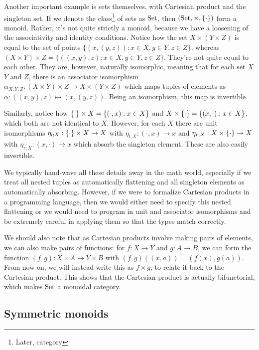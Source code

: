 Another important example is sets themselves, with Cartesian product and the singleton set.
If we denote the class\footnote{Later, category} of sets as $\mathrm{Set}$, then $(\mathrm{Set}, \times, \{\cdot\})$ form a monoid.
Rather, it's not quite strictly a monoid, because we have a loosening of the associativity and identity conditions.
Notice how the set $X\times(Y\times Z)$ is equal to the set of points $\{(x,(y,z)):x\in X, y\in Y, z\in Z\}$, whereas
$(X\times Y)\times Z = \{((x,y),z):x\in X, y\in Y, z\in Z\}$.
They're not quite equal to each other.
They are, however, naturally isomorphic, meaning that for each set $X$ $Y$ and $Z$, there is an associator isomorphism $\alpha_{X,Y,Z}: (X\times Y)\times Z \rightarrow X\times (Y\times Z)$ which maps tuples of elements as $\alpha : ((x,y),z) \mapsto (x,(y,z))$.
Being an isomorphism, this map is invertible.

Similarly, notice how $\{\cdot\} \times X = \{(\cdot, x):x\in X\}$ and $X\times \{\cdot\} = \{(x,\cdot):x\in X\}$, which both are not identical to $X$.
However, for each $X$ there are unit isomorphisms $\eta_{l;X} : \{\cdot\} \times X \rightarrow X$ with $\eta_{l;X} : (\cdot, x) \rightarrow x$ and $\eta_{r;X} : X \times \{\cdot\} \rightarrow X$ with $\eta_{r;X} : (x,\cdot) \rightarrow x$ which absorb the singleton element.
These are also easily invertible.

We typically hand-wave all these details away in the math world, especially if we treat all nested tuples as automatically flattening and all singleton elements as automatically absorbing.
However, if we were to formalize Cartesian products in a programming language, then we would either need to specify this nested flattening or we would need to program in unit and associator isomorphisms and be extremely careful in applying them so that the types match correctly.

We should also note that as Cartesian products involve making pairs of elements, we can also make pairs of functions:
for $f : X\rightarrow Y$ and $g:A\rightarrow B$, we can form the function $(f,g) : X\times A \rightarrow Y\times B$ with $(f,g)((x,a)) = (f(x), g(a))$.
From now on, we will instead write this as $f\times g$, to relate it back to the Cartesian product.
This shows that the Cartesian product is actually bifunctorial, which makes $\mathrm{Set}$ a monoidal category.

\subsection{Symmetric monoids}

